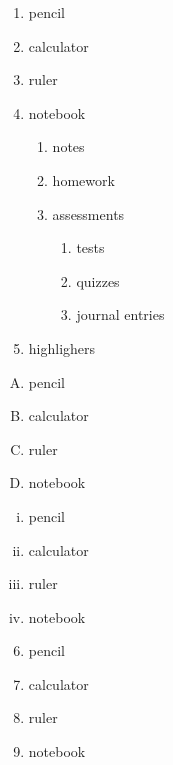 \documentclass[11pt]{article}
\begin{document}
\begin{enumerate} %
    \item pencil
    \item calculator
    \item ruler
    \item notebook
    \begin{enumerate} %
        \item notes
        \item homework
        \item assessments
        \begin{enumerate}
            \item tests
            \item quizzes
            \item journal entries
        \end{enumerate}
    \end{enumerate}
    \item highlighers
\end{enumerate}

\vspace{1cm}

\begin{enumerate}[A.] %
    \item pencil
    \item calculator
    \item ruler
    \item notebook
\end{enumerate}

\vspace{1cm}

\begin{enumerate}[i.] %
    \item pencil
    \item calculator
    \item ruler
    \item notebook
\end{enumerate}

\pagebreak %

\begin{enumerate} \setcounter{enumi}{5} %
    \item pencil
    \item calculator
    \item ruler
    \item notebook
\end{enumerate}
\end{document}
